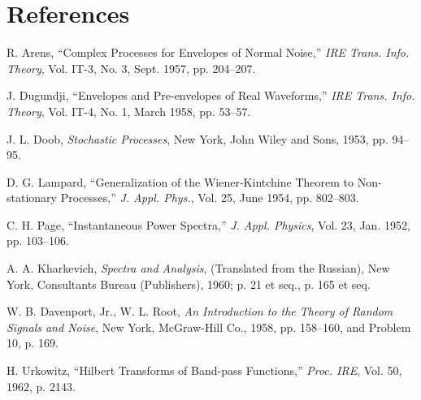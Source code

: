 \documentclass[12pt]{article}
\begin{document}
\section*{References}
\begin{thebibliography}{8}
R. Arens, ``Complex Processes for Envelopes of Normal Noise,'' \emph{IRE Trans. Info. Theory}, Vol. IT-3, No. 3, Sept. 1957, pp. 204--207.

J. Dugundji, ``Envelopes and Pre-envelopes of Real Waveforms,'' \emph{IRE Trans. Info. Theory}, Vol. IT-4, No. 1, March 1958, pp. 53--57.

J. L. Doob, \emph{Stochastic Processes}, New York, John Wiley and Sons, 1953, pp. 94--95.

D. G. Lampard, ``Generalization of the Wiener-Kintchine Theorem to Non-stationary Processes,'' \emph{J. Appl. Phys.}, Vol. 25, June 1954, pp. 802--803.

C. H. Page, ``Instantaneous Power Spectra,'' \emph{J. Appl. Physics}, Vol. 23, Jan. 1952, pp. 103--106.

A. A. Kharkevich, \emph{Spectra and Analysis}, (Translated from the Russian), New York, Consultants Bureau (Publishers), 1960; p. 21 et seq., p. 165 et seq.

W. B. Davenport, Jr., W. L. Root, \emph{An Introduction to the Theory of Random Signals and Noise}, New York, McGraw-Hill Co., 1958, pp. 158--160, and Problem 10, p. 169.

H. Urkowitz, ``Hilbert Transforms of Band-pass Functions,'' \emph{Proc. IRE}, Vol. 50, 1962, p. 2143.
\end{thebibliography}
\end{document}
